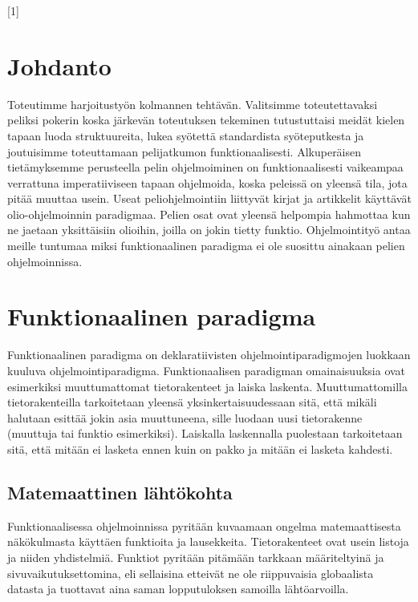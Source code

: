 \documentclass[12pt]{article}
\begin{document}
[1]
{}
{}
% 

\maketitle

\newpage

\section{Johdanto}
Toteutimme harjoitustyön kolmannen tehtävän.
Valitsimme toteutettavaksi peliksi pokerin koska järkevän toteutuksen tekeminen tutustuttaisi meidät kielen tapaan luoda struktuureita,
lukea syötettä standardista syöteputkesta ja joutuisimme toteuttamaan pelijatkumon funktionaalisesti. Alkuperäisen tietämyksemme perusteella pelin ohjelmoiminen on funktionaalisesti vaikeampaa verrattuna imperatiiviseen tapaan ohjelmoida, koska peleissä on yleensä tila, jota pitää muuttaa usein. Useat peliohjelmointiin liittyvät kirjat ja artikkelit käyttävät olio-ohjelmoinnin paradigmaa. Pelien osat ovat yleensä helpompia hahmottaa kun ne jaetaan yksittäisiin olioihin, joilla on jokin tietty funktio. Ohjelmointityö antaa meille tuntumaa miksi funktionaalinen paradigma ei ole suosittu ainakaan pelien ohjelmoinnissa.

\newpage
\section{Funktionaalinen paradigma}
Funktionaalinen paradigma on deklaratiivisten ohjelmointiparadigmojen luokkaan kuuluva ohjelmointiparadigma. Funktionaalisen paradigman omainaisuuksia ovat esimerkiksi muuttumattomat tietorakenteet ja laiska laskenta. Muuttumattomilla tietorakenteilla tarkoitetaan yleensä yksinkertaisuudessaan sitä, että mikäli halutaan esittää jokin asia muuttuneena, sille luodaan uusi tietorakenne (muuttuja tai funktio esimerkiksi). Laiskalla laskennalla puolestaan tarkoitetaan sitä, että mitään ei lasketa ennen kuin on pakko ja mitään ei lasketa kahdesti.

\subsection{Matemaattinen lähtökohta}
Funktionaalisessa ohjelmoinnissa pyritään kuvaamaan ongelma matemaattisesta näkökulmasta käyttäen funktioita ja lausekkeita. Tietorakenteet ovat usein listoja ja niiden yhdistelmiä. Funktiot pyritään pitämään tarkkaan määriteltyinä ja sivuvaikutuksettomina, eli sellaisina etteivät ne ole riippuvaisia globaalista datasta ja tuottavat aina saman lopputuloksen samoilla lähtöarvoilla.
\end{document}
